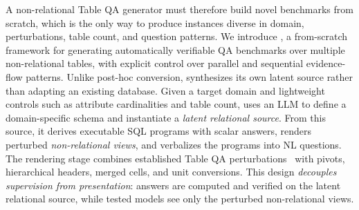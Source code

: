 A non-relational Table QA generator must therefore build novel benchmarks from scratch, which is the only way to produce instances diverse in domain, perturbations, table count, and question patterns. 
We introduce \name, a from-scratch framework for generating automatically verifiable QA benchmarks over multiple non-relational tables, with explicit control over parallel and sequential evidence-flow patterns. Unlike post-hoc conversion, \name synthesizes its own latent source rather than adapting an existing database. Given a target domain and lightweight controls such as attribute cardinalities and table count, \name uses an LLM to define a domain-specific schema and instantiate a \emph{latent relational source}. From this source, it derives executable SQL programs with scalar answers, renders perturbed \emph{non-relational views}, and verbalizes the programs into NL questions. The rendering stage combines established Table QA perturbations~\cite{2.4,2.5,2.6,2.8} with pivots, hierarchical headers, merged cells, and unit conversions. This design \emph{decouples supervision from presentation}: answers are computed and verified on the latent relational source, while tested models see only the perturbed non-relational views.
